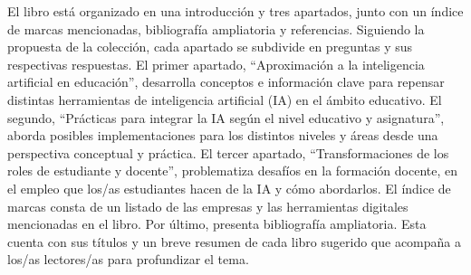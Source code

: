 \documentclass[spanish]{textolivre}
\begin{document}
El libro está organizado en una introducción y tres apartados, junto con un índice de marcas mencionadas, bibliografía ampliatoria y referencias. Siguiendo la propuesta de la colección, cada apartado se subdivide en preguntas y sus respectivas respuestas. El primer apartado, “Aproximación a la inteligencia artificial en educación”, desarrolla conceptos e información clave para repensar distintas herramientas de inteligencia artificial (IA) en el ámbito educativo. El segundo, “Prácticas para integrar la IA según el nivel educativo y asignatura”, aborda posibles implementaciones para los distintos niveles y áreas desde una perspectiva conceptual y práctica. El tercer apartado, “Transformaciones de los roles de estudiante y docente”, problematiza desafíos en la formación docente, en el empleo que los/as estudiantes hacen de la IA y cómo abordarlos. El índice de marcas consta de un listado de las empresas y las herramientas digitales mencionadas en el libro. Por último, presenta bibliografía ampliatoria. Esta cuenta con sus títulos y un breve resumen de cada libro sugerido que acompaña a los/as lectores/as para profundizar el tema.
\end{document}
